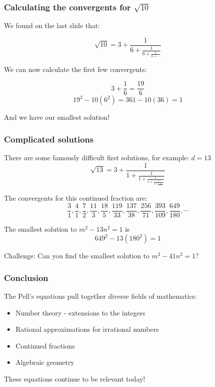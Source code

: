 \documentclass[t]{beamer}
\begin{document}
\begin{frame}
	\frametitle{Calculating the convergents for $\sqrt{10}$}

	We found on the last slide that:

	\[ \sqrt{10} = 3 + \frac{1}{6 + \frac{1}{6 + \frac{1}{6 + \cdots}}} \]
	
	We can now calculate the first few convergents:

	\[ 3 + \frac{1}{6} = \frac{19}{6} \]
	\[ 19^2 - 10(6^2) = 361 - 10(36) = 1 \]

	And we have our smallest solution!

\end{frame}

\begin{frame}
	\frametitle{Complicated solutions}
	
	There are some famously difficult first solutions, for example: $d = 13$
	\[ \sqrt{13} = 3 + \frac{1}{1+\frac{1}{1+\frac{1}{1+\frac{1}{1+\frac{1}{6+\cdots}}}}}\]

	The convergents for this continued fraction are:
	\[ \frac{3}{1}, \frac{4}{1}, \frac{7}{2}, \frac{11}{3}, \frac{18}{5}, \frac{119}{33}, \frac{137}{38}, \frac{256}{71}, \frac{393}{109}, \frac{649}{180}, \cdots \]

	The smallest solution to $m^2-13n^2=1$ is
	\[ 649^2 - 13(180^2) = 1 \]

	Challenge: Can you find the smallest solution to $m^2-41n^2=1$?

\end{frame}

\begin{frame}
	\frametitle{Conclusion}

	The Pell's equations pull together diverse fields of mathematics:
	
	\vspace{1em}
	\begin{itemize}
		\item Number theory - extensions to the integers
		\item Rational approximations for irrational numbers
		\item Continued fractions
		\item Algebraic geometry
	\end{itemize}

	\vspace{1em}
	These equations continue to be relevant today! 

\end{frame}
\end{document}
